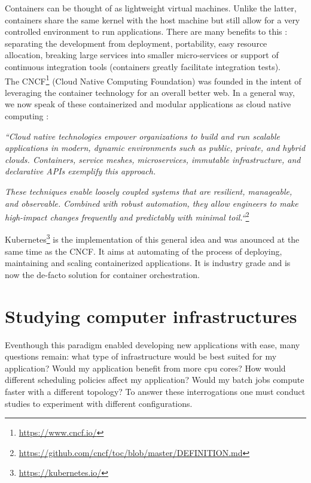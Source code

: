 \documentclass[12pt, a4paper]{memoir}
\begin{document}
Containers can be thought of as lightweight virtual machines. Unlike the
latter, containers share the same kernel with the host machine but still allow
for a very controlled environment to run applications. There are many
benefits to this : separating the development from deployment, portability,
easy resource allocation, breaking large services into smaller micro-services
or support of continuous integration tools (containers greatly facilitate
integration tests).\\

The CNCF\footnote{\url{https://www.cncf.io/}} (Cloud Native Computing
Foundation) was founded in the intent of leveraging the container technology
for an overall better web. In a general way, we now speak of these
containerized and modular applications as cloud native computing :

\textit{``Cloud native technologies empower organizations to build and run
	scalable applications in modern, dynamic environments such as public,
	private, and hybrid clouds. Containers, service meshes, microservices,
	immutable infrastructure, and declarative APIs exemplify this
	approach.}

\textit{These techniques enable loosely coupled systems that
	are resilient, manageable, and observable.  Combined with robust
	automation, they allow engineers to make high-impact changes frequently
	and predictably with minimal toil.``}\footnote{\url{https://github.com/cncf/toc/blob/master/DEFINITION.md}}

Kubernetes\footnote{\url{https://kubernetes.io/}} is the implementation of this
general idea and was anounced at the same time as the CNCF. It aims at
automating of the process of deploying, maintaining and scaling containerized
applications. It is industry grade and is now the de-facto solution for
container orchestration.



\section{Studying computer infrastructures} \label{study-computing-infra}

Eventhough this paradigm enabled developing new applications with ease, many
questions remain: what type of infrastructure would be best suited for my
application? Would my application benefit from more cpu cores? How would
different scheduling policies affect my application? Would my batch jobs
compute faster with a different topology? To answer these interrogations one
must conduct studies to experiment with different configurations.\\
\end{document}
